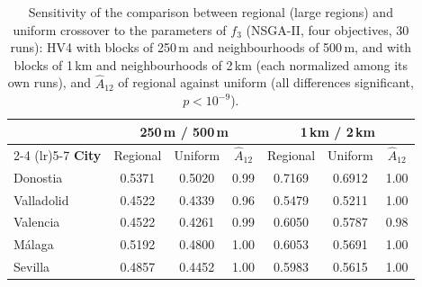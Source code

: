 \begin{table}[htbp]
\centering
\small
\caption{Sensitivity of the comparison between regional (large regions) and uniform crossover to the parameters of $f_3$ (NSGA-II, four objectives, 30 runs): HV4 with blocks of 250\,m and neighbourhoods of 500\,m, and with blocks of 1\,km and neighbourhoods of 2\,km (each normalized among its own runs), and $\hat{A}_{12}$ of regional against uniform (all differences significant, $p < 10^{-9}$).}
\label{tab:sensitivity}
\begin{tabular}{lcccccc}
\toprule
& \multicolumn{3}{c}{\textbf{250\,m / 500\,m}} & \multicolumn{3}{c}{\textbf{1\,km / 2\,km}} \\
\cmidrule(lr){2-4} \cmidrule(lr){5-7}
\textbf{City} & Regional & Uniform & $\hat{A}_{12}$ & Regional & Uniform & $\hat{A}_{12}$ \\
\midrule
Donostia & 0.5371 & 0.5020 & 0.99 & 0.7169 & 0.6912 & 1.00 \\
Valladolid & 0.4522 & 0.4339 & 0.96 & 0.5479 & 0.5211 & 1.00 \\
Valencia & 0.4522 & 0.4261 & 0.99 & 0.6050 & 0.5787 & 0.98 \\
Málaga & 0.5192 & 0.4800 & 1.00 & 0.6053 & 0.5691 & 1.00 \\
Sevilla & 0.4857 & 0.4452 & 1.00 & 0.5983 & 0.5615 & 1.00 \\
\bottomrule
\end{tabular}
\end{table}
